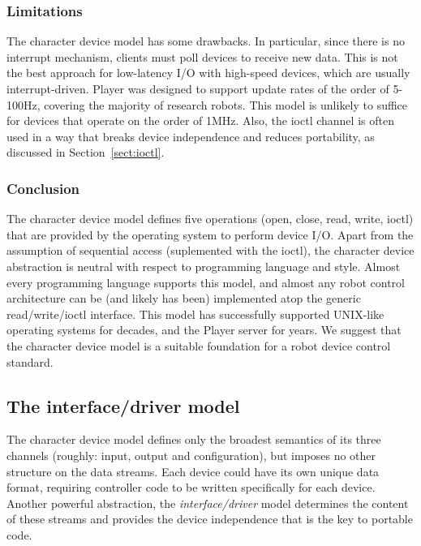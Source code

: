 \documentclass[letterpaper, 10 pt, conference]{iros03}
\begin{document}
\subsubsection{Limitations}
The character device model has some drawbacks. In particular, since
there is no interrupt mechanism, clients must poll devices to receive
new data.  This is not the best approach for low-latency I/O with
high-speed devices, which are usually interrupt-driven. Player was
designed to support update rates of the order of 5-100Hz, covering the
majority of research robots. This model is unlikely to suffice for
devices that operate on the order of 1MHz. Also, the ioctl channel is
often used in a way that breaks device independence and reduces
portability, as discussed in Section~\ref{sect:ioctl}.

\subsubsection{Conclusion}
The character device model defines five operations (open, close,
read, write, ioctl) that are provided by the operating system to
perform device I/O. Apart from the assumption of sequential access
(suplemented with the ioctl), the character device abstraction is
neutral with respect to programming language and style. Almost every
programming language supports this model, and almost any robot control
architecture can be (and likely has been) implemented atop the generic
read/write/ioctl interface.  This model has successfully supported
UNIX-like operating systems for decades, and the Player server for
years.  We suggest that the character device model is a suitable foundation
for a robot device control standard.

\subsection{The interface/driver model}
%
%

The character device model defines only the broadest semantics of its
three channels (roughly: input, output and configuration), but imposes
no other structure on the data streams. Each device could have its own
unique data format, requiring controller code to be written
specifically for each device. Another powerful abstraction, the {\em
interface/driver} model determines the content of these streams and
provides the device independence that is the key to portable code.
\end{document}
